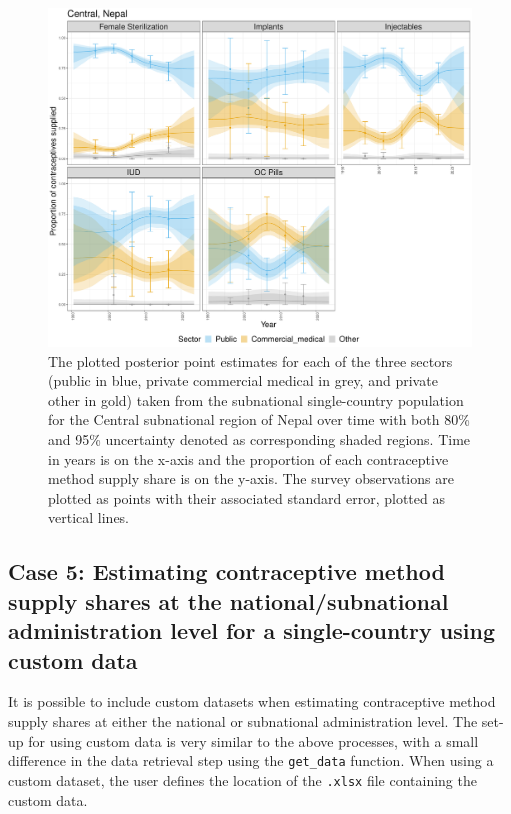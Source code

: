 \begin{figure}[H]
\includegraphics[width=1\linewidth,height=0.4\textheight]{figures/fig_5} \caption{The plotted posterior point estimates for each of the three sectors (public in blue, private commercial medical in grey, and private other in gold) taken from the subnational single-country population for the Central subnational region of Nepal over time with both 80\% and 95\% uncertainty denoted as corresponding shaded regions. Time in years is on the x-axis and the proportion of each contraceptive method supply share is on the y-axis. The survey observations are plotted as points with their associated standard error, plotted as vertical lines.}\label{fig:fig-5}
\end{figure}

\hypertarget{case-5-estimating-contraceptive-method-supply-shares-at-the-nationalsubnational-administration-level-for-a-single-country-using-custom-data}{%
\subsection{Case 5: Estimating contraceptive method supply shares at the national/subnational administration level for a single-country using custom data}\label{case-5-estimating-contraceptive-method-supply-shares-at-the-nationalsubnational-administration-level-for-a-single-country-using-custom-data}}

It is possible to include custom datasets when estimating contraceptive method supply shares at either the national or subnational administration level. The set-up for using custom data is very similar to the above processes, with a small difference in the data retrieval step using the \texttt{get\_data} function. When using a custom dataset, the user defines the location of the \texttt{.xlsx} file containing the custom data.

